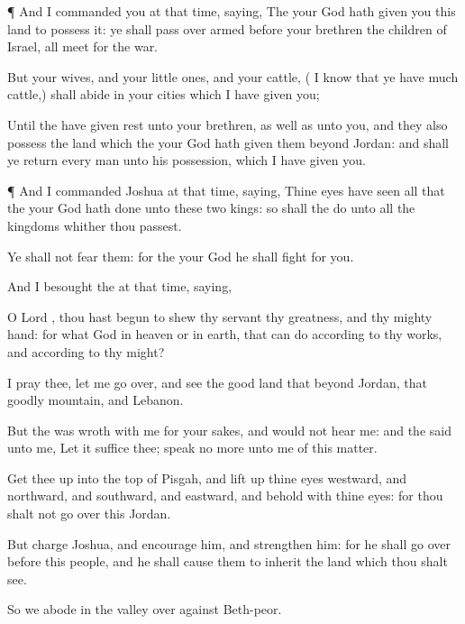 {\par }{\PP {}¶ And I
commanded you at that
time,
saying, The
{} your
God hath
given you this
land to
possess it: ye shall pass
over
armed
before your
brethren the
children of
Israel, all
{}
meet for the
war.

But your
wives, and your little
ones, and your
cattle, ({} I
know that ye have
much
cattle,) shall
abide in your
cities which I have
given you;

Until the
{} have given
rest unto your
brethren, as well as unto you, and
{} they also
possess the
land which the
{} your
God hath
given them
beyond
Jordan: and
{} shall ye
return every
man unto his
possession, which I have
given you.


\par }{\PP {}¶ And I
commanded
Joshua at that
time,
saying, Thine
eyes have
seen all that the
{} your
God hath
done unto these
two
kings: so shall the
{}
do unto all the
kingdoms whither thou
passest.

Ye shall not
fear them: for the
{} your
God he shall
fight for you.

And I
besought the
{} at that
time,
saying,

O
Lord
{}, thou hast
begun to
shew thy
servant thy
greatness, and thy
mighty
hand: for what
God
{} in
heaven or in
earth, that can
do according to thy
works, and according to thy
might?

I pray thee, let me go
over, and
see the
good
land that
{}
beyond
Jordan, that
goodly
mountain, and
Lebanon.

But the
{} was
wroth with me for your sakes, and would not
hear me: and the
{}
said unto me, Let it
suffice thee;
speak no
more unto me of this
matter.

Get thee
up into the
top of
Pisgah, and lift
up thine
eyes
westward, and
northward, and
southward, and
eastward, and
behold
{} with thine
eyes: for thou shalt not go
over this
Jordan.

But
charge
Joshua, and
encourage him, and
strengthen him: for he shall go
over
before this
people, and he shall cause them to
inherit the
land which thou shalt
see.

So we
abode in the
valley over
against
Beth-peor.




}
